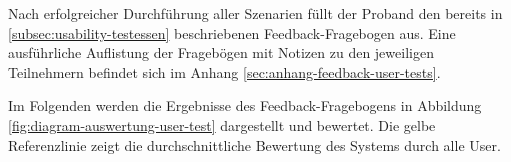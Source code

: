 Nach erfolgreicher Durchführung aller Szenarien füllt der Proband den bereits in \ref{subsec:usability-testessen} beschriebenen Feedback-Fragebogen aus. Eine ausführliche Auflistung der Fragebögen mit Notizen zu den jeweiligen Teilnehmern befindet sich im Anhang \ref{sec:anhang-feedback-user-tests}. 

Im Folgenden werden die Ergebnisse des Feedback-Fragebogens in Abbildung \ref{fig:diagram-auswertung-user-test} dargestellt und bewertet. Die gelbe Referenzlinie zeigt die durchschnittliche Bewertung des Systems durch alle User. 
\newline

\begin{figure}[htb]
    
\end{figure}
